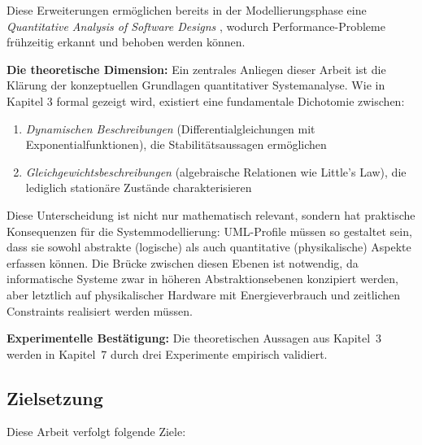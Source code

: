 ﻿\documentclass[a4paper,12pt]{scrreprt}
\theoremstyle{definition}
\begin{document}
Diese Erweiterungen ermöglichen bereits in der Modellierungsphase eine \textit{Quantitative Analysis of Software Designs} \cite{smith1990}, wodurch Performance-Probleme frühzeitig erkannt und behoben werden können.

\textbf{Die theoretische Dimension:} Ein zentrales Anliegen dieser Arbeit ist die Klärung der konzeptuellen Grundlagen quantitativer Systemanalyse. Wie in Kapitel 3 formal gezeigt wird, existiert eine fundamentale Dichotomie zwischen:

\begin{enumerate}
	\item[-] \textit{Dynamischen Beschreibungen} (Differentialgleichungen mit Exponentialfunktionen), die Stabilitätsaussagen ermöglichen
	\item[-] \textit{Gleichgewichtsbeschreibungen} (algebraische Relationen wie Little's Law), die lediglich stationäre Zustände charakterisieren
\end{enumerate}

Diese Unterscheidung ist nicht nur mathematisch relevant, sondern hat praktische Konsequenzen für die Systemmodellierung: UML-Profile müssen so gestaltet sein, dass sie sowohl abstrakte (logische) als auch quantitative (physikalische) Aspekte erfassen können. Die Brücke zwischen diesen Ebenen ist notwendig, da informatische Systeme zwar in höheren Abstraktionsebenen konzipiert werden, aber letztlich auf physikalischer Hardware mit Energieverbrauch und zeitlichen Constraints realisiert werden müssen.

\textbf{Experimentelle Bestätigung:} Die theoretischen Aussagen aus
Kapitel~3 werden in Kapitel~7 durch drei Experimente empirisch validiert.

\subsection{Zielsetzung}

Diese Arbeit verfolgt folgende Ziele:
\end{document}
